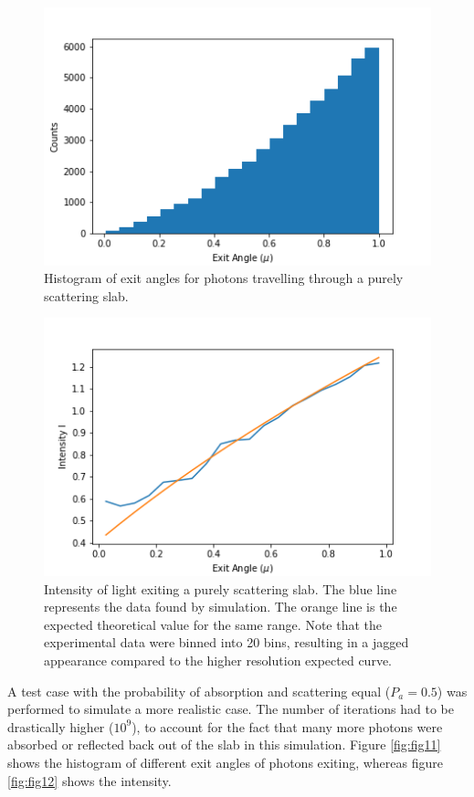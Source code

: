 \documentclass[twocolumn]{article}
\begin{document}
\begin{figure}[h]
\centering
\includegraphics[width=1\linewidth]{fig9}
\caption{Histogram of exit angles for photons travelling through a purely scattering slab.}
\label{fig:fig9}
\end{figure}

\begin{figure}[h]
\centering
\includegraphics[width=1\linewidth]{fig10}
\caption{Intensity of light exiting a purely scattering slab. The blue line represents the data found by simulation. The orange line is the expected theoretical value for the same range. Note that the experimental data were binned into 20 bins, resulting in a jagged appearance compared to the higher resolution expected curve.}
\label{fig:fig10}
\end{figure}

A test case with the probability of absorption and scattering equal ($P_a=0.5$) was performed to simulate a more realistic case. The number of iterations had to be drastically higher ($10^9$), to account for the fact that many more photons were absorbed or reflected back out of the slab in this simulation. Figure \ref{fig:fig11} shows the histogram of different exit angles of photons exiting, whereas figure \ref{fig:fig12} shows the intensity.
\end{document}
